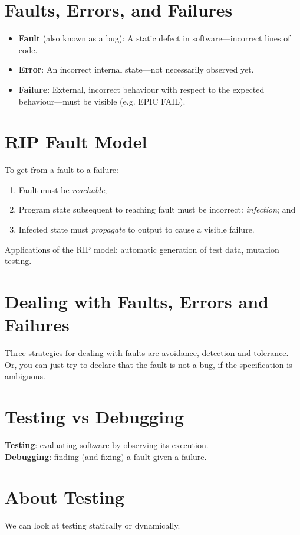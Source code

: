 \documentclass[11pt]{article}
\begin{document}
\section*{Faults, Errors, and Failures}
\begin{itemize}
\item {\bf Fault} (also known as a bug): A static defect in software---incorrect lines of code.
\item {\bf Error}: An incorrect internal state---not necessarily observed yet.
\item {\bf Failure}: External, incorrect behaviour with respect to the expected behaviour---must be visible (e.g. EPIC FAIL).
\end{itemize}

\section*{RIP Fault Model}
To get from a fault to a failure:
\begin{enumerate}
\item Fault must be \emph{reachable};
\item Program state subsequent to reaching fault must be incorrect: \emph{infection}; and
\item Infected state must \emph{propagate} to output to cause a visible failure.
\end{enumerate}
Applications of the RIP model: automatic generation of test data, mutation testing.

\section*{Dealing with Faults, Errors and Failures}
Three strategies for dealing with faults are avoidance, detection and
tolerance. Or, you can just try to declare that the fault is not
a bug, if the specification is ambiguous.

\section*{Testing vs Debugging}
{\bf Testing}: evaluating software by observing its execution.\\
{\bf Debugging}: finding (and fixing) a fault given a failure.

\section*{About Testing}
We can look at testing statically or dynamically.
\end{document}
